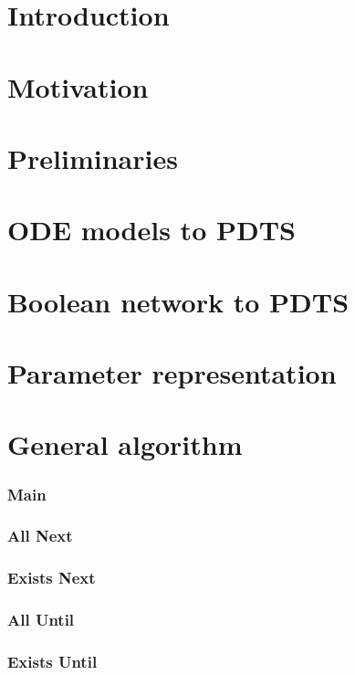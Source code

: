 






\chapter{Introduction}

\chapter{Motivation}

\chapter{Preliminaries}


\chapter{ODE models to PDTS}

\chapter{Boolean network to PDTS}

\chapter{Parameter representation}

\chapter{General algorithm}
	\subsection{Main}
	\subsection{All Next}
	\subsection{Exists Next}
	\subsection{All Until}
	\subsection{Exists Until}
